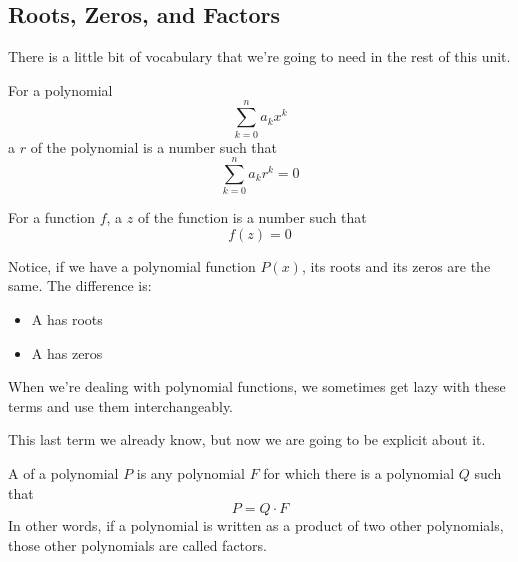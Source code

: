 \subsection{Roots, Zeros, and Factors}
There is a little bit of vocabulary that we're going to need in the rest of this unit.
\begin{definition}[Root]
For a polynomial $$\sum_{k=0}^n{a_k x^k}$$ a  $r$ of the polynomial is a number such that $$\sum_{k=0}^n{a_k r^k}=0$$
\end{definition}
\begin{definition}[Zero]
For a function $f$, a  $z$ of the function is a number such that $$f(z)=0$$
\end{definition}
Notice, if we have a polynomial function $P(x)$, its roots and its zeros are the same. The difference is:
\begin{itemize}
\item A \makeblank has roots
\item A \makeblank has zeros
\end{itemize}
When we're dealing with polynomial functions, we sometimes get lazy with these terms and use them interchangeably.

This last term we already know, but now we are going to be explicit about it.
\begin{definition}
A  of a polynomial $P$ is any polynomial $F$ for which there is a polynomial $Q$ such that $$P=Q\cdot F$$
In other words, if a polynomial is written as a product of two other polynomials, those other polynomials are called factors.
\end{definition}
